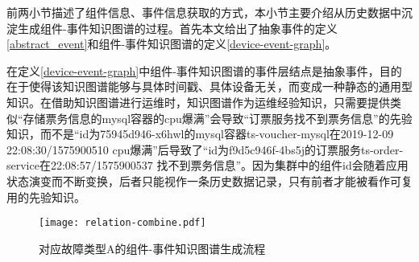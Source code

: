 前两小节描述了组件信息、事件信息获取的方式，本小节主要介绍从历史数据中沉淀生成组件-事件知识图谱的过程。首先本文给出了抽象事件的定义\ref{abstract_event}和组件-事件知识图谱的定义\ref{device-event-graph}。

在定义\ref{device-event-graph}中组件-事件知识图谱的事件层结点是抽象事件，目的在于使得该知识图谱能够与具体时间戳、具体设备无关，而变成一种静态的通用型知识。在借助知识图谱进行运维时，知识图谱作为运维经验知识，只需要提供类似“存储票务信息的mysql容器的cpu爆满”会导致“订票服务找不到票务信息”的先验知识，而不是“id为75945d946-x6hwl的mysql容器ts-voucher-mysql在2019-12-09 22:08:30/1575900510 cpu爆满”后导致了“id为f9d5c946f-4bs5j的订票服务ts-order-service在22:08:57/1575900537 找不到票务信息”。因为集群中的组件id会随着应用状态演变而不断变换，后者只能视作一条历史数据记录，只有前者才能被看作可复用的先验知识。
\begin{figure}[htbp]
    \centering
    \texttt{[image: relation-combine.pdf]}
    \caption{对应故障类型A的组件-事件知识图谱生成流程\label{relation-combine}}
\end{figure}

